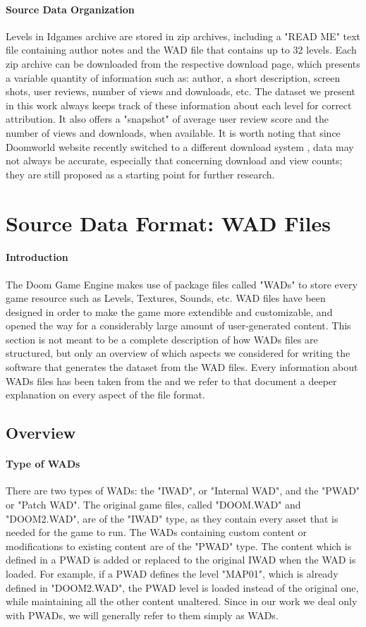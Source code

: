 \paragraph{Source Data Organization} Levels in Idgames archive are stored in zip archives, including a "READ ME" text file containing author notes and the \gls{WAD} file that contains up to 32 levels. 
Each zip archive can be downloaded from the respective download page, which presents a variable quantity of information such as: author, a short description, screen shots, user reviews, number of views and downloads, etc.
The dataset we present in this work always keeps track of these information about each level for correct attribution. It also offers a "snapshot" of average user review score and the number of views and downloads, when available. It is worth noting that since Doomworld website recently switched to a different download system \cite{wiki:doomworld}, data may not always be accurate, especially that concerning download and view counts; they are still proposed as a starting point for further research. 
\section{Source Data Format: WAD Files}
\label{sec:WAD} 
\paragraph{Introduction} The Doom Game Engine \cite{doomengine} makes use of package files called "\glspl{WAD}" to store every game resource such as Levels, Textures, Sounds, etc. 
\gls{WAD} files have been designed in order to make the game more extendible and customizable, and opened the way for a considerably large amount of user-generated content. This section is not meant to be a complete description of how \glspl{WAD} files are structured, but only an overview of which aspects we considered for writing the software that generates the dataset from the \gls{WAD} files. Every information about \glspl{WAD} files has been taken from the  \cite{doomspecs} and we refer to that document a deeper explanation on every aspect of the file format.
\subsection{Overview}
\paragraph{Type of WADs}
There are two types of \glspl{WAD}: the "IWAD", or "Internal WAD", and the "PWAD" or "Patch WAD". The original game files, called "DOOM.WAD" and "DOOM2.WAD", are of the "IWAD" type, as they contain every asset that is needed for the game to run. The \glspl{WAD} containing custom content or modifications to existing content are of the "PWAD" type. The content which is defined in a PWAD is added or replaced to the original IWAD when the \gls{WAD} is loaded. For example, if a PWAD defines the level "MAP01", which is already defined in "DOOM2.WAD", the PWAD level is loaded instead of the original one, while maintaining all the other content unaltered.
Since in our work we deal only with PWADs, we will generally refer to them simply as \glspl{WAD}.

